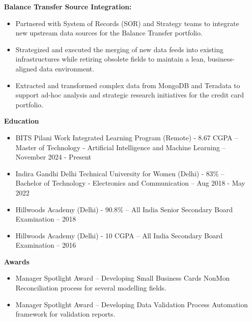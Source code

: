 \documentclass[9.5pt]{article}
\newcommand{\sectionhead}[1]{\vspace{4pt}\textbf{#1}\vspace{1pt}\par}
\begin{document}
\textbf{Balance Transfer Source Integration:}
\begin{itemize}
\item Partnered with System of Records (SOR) and Strategy teams to integrate new upstream data sources for the Balance Transfer portfolio.
\item Strategized and executed the merging of new data feeds into existing infrastructures while retiring obsolete fields to maintain a lean, business-aligned data environment.
\item Extracted and transformed complex data from MongoDB and Teradata to support ad-hoc analysis and strategic research initiatives for the credit card portfolio.
\end{itemize}

\sectionhead{Education}
\begin{itemize}
\item BITS Pilani Work Integrated Learning Program (Remote) - 8.67 CGPA -- Master of Technology - Artificial Intelligence and Machine Learning -- November 2024 - Present
\item Indira Gandhi Delhi Technical University for Women (Delhi) - 83\% -- Bachelor of Technology - Electronics and Communication -- Aug 2018 - May 2022
\item Hillwoods Academy (Delhi) - 90.8\% -- All India Senior Secondary Board Examination -- 2018
\item Hillwoods Academy (Delhi) - 10 CGPA -- All India Secondary Board Examination -- 2016
\end{itemize}

\sectionhead{Awards}
\begin{itemize}
\item Manager Spotlight Award -- Developing Small Business Cards NonMon Reconciliation process for several modelling fields.
\item Manager Spotlight Award -- Developing Data Validation Process Automation framework for validation reports.
\end{itemize}
\end{document}
